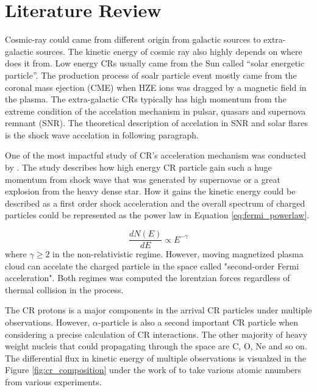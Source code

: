 \chapter{Literature Review}


Cosmic-ray could came from different origin from galactic sources
to extra-galactic sources. The kinetic energy of cosmic ray also 
highly depends on where does it from. Low energy CRs usually came from 
the Sun called ``solar energetic particle''. The production process of 
soalr particle event mostly came from the coronal mass ejection (CME)
when HZE ions was dragged by a magnetic field in the plasma.
The extra-galactic CRs typically 
has high momentum from the extreme condition of the accelation mechanism
in pulsar, quasars and supernova remnant (SNR). 
The theoretical description of accelation in SNR and solar flares
is the shock wave accelation in following paragraph.

One of the most impactful study of CR's acceleration mechanism 
was conducted by \cite{fermi1949origin}. 
The study describes how high energy CR particle gain such a huge 
momentum from shock wave that was generated by supernovae 
or a great explosion from the heavy dense star. How it gains
the kinetic energy could be described as a first order shock 
acceleration and the overall spectrum of charged particles could be
represented as the power law in Equation \ref{eq:fermi_powerlaw}.

\begin{equation}
    \frac{dN(E)}{dE} \propto E^{-\gamma}
    \label{eq:fermi_powerlaw}
\end{equation}
where $\gamma \geq 2$ in the non-relativistic regime.
However, moving magnetized plasma cloud can accelate the charged 
particle in the space called "second-order Fermi acceleration".
Both regimes was computed the lorentzian forces regardless of 
thermal collision in the process.

The CR protons is a major components in the arrival CR particles 
under multiple observations. However, $\alpha$-particle is also 
a second important CR particle when considering a precise calculation
of CR interactions. The other majority of heavy weight nucleis that 
could propagating through the space are C, O, Ne and so on. 
The differential flux in kinetic energy of multiple observations is 
visualzed in the Figure \ref{fig:cr_composition} under the work of 
\cite{review_particle_physics2012} to take various atomic nnumbers 
from various experiments.

